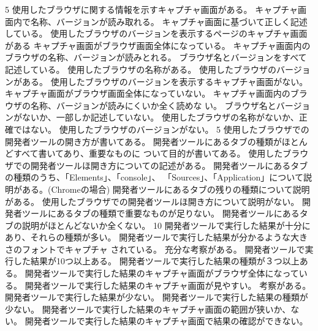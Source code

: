 {
{}{5}{
	{使用したブラウザに関する情報を示すキャプチャ画面がある。}
  {キャプチャ画面内で名称、バージョンが読み取れる。}
  {キャプチャ画面に基づいて正しく記述している。}
	}
	{
	{使用したブラウザのバージョンを表示するページのキャプチャ画面がある}
  {キャプチャ画面がブラウザ画面全体になっている。}
  {キャプチャ画面内のブラウザの名称、バージョンが読みとれる。}
  {ブラウザ名とバージョンをすべて記述している。}
	{使用したブラウザの名称がある。}
  {使用したブラウザのバージョンがある。}
  {}
	}
	{
	{使用したブラウザのバージョンを表示するキャプチャ画面がない。}
  {キャプチャ画面がブラウザ画面全体になっていない。}
  {キャプチャ画面内のブラウザの名称、バージョンが読みにくいか全く読めな
  い。}
  {ブラウザ名とバージョンがないか、一部しか記述していない。}
	{使用したブラウザの名称がないか、正確ではない。}
  {使用したブラウザのバージョンがない。}
	}
  {}{5}{
	{使用したブラウザでの開発者ツールの開き方が書いてある。}
  {開発者ツールにあるタブの種類がほとんどすべて書いてあり、重要なものに
  ついて目的が書いてある。}
  }
  {
	{使用したブラウザでの開発者ツールほ開き方についての記述がある。}
  {開発者ツールにあるタブの種類のうち、「Elements」、「console」、
  「Sources」、「Application」について説明がある。(Chromeの場合)}
  {開発者ツールにあるタブの残りの種類について説明がある。}
  }
  {
	{使用したブラウザでの開発者ツールほ開き方について説明がない。}
  {開発者ツールにあるタブの種類で重要なものが足りない。}
  {開発者ツールにあるタブの説明がほとんどないか全くない。}
  }
  {}{10}{
  {開発者ツールで実行した結果が十分にあり、それらの種類が多い。}
  {開発者ツールで実行した結果が分かるような大きさのフォントでキャプチャ
  されている。}
  {充分な考察がある。}
  }
  {
  {開発者ツールで実行した結果が10つ以上ある。}
  {開発者ツールで実行した結果の種類が３つ以上ある。}
  {開発者ツールで実行した結果のキャプチャ画面がブラウザ全体になっている。}
  {開発者ツールで実行した結果のキャプチャ画面が見やすい。}
  {考察がある。}
  }
  {
  {開発者ツールで実行した結果が少ない。}
  {開発者ツールで実行した結果の種類が少ない。}
  {開発者ツールで実行した結果のキャプチャ画面の範囲が狭いか、ない。}
  {開発者ツールで実行した結果のキャプチャ画面で結果の確認ができない。}
}}
